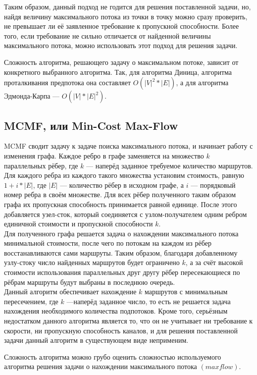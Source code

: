 \documentclass[a4paper]{article}
\begin{document}
Таким образом, данный подход не годится для решения поставленной задачи, но, найдя величину максимального потока из точки в точку можно сразу проверить, не превышает ли её заявленное требование к пропускной способности. Более того, если требование не сильно отличается от найденной величины максимального потока, можно использовать этот подход для решения задачи.

Сложность алгоритма, решающего задачу о максимальном потоке, зависит от конкретного выбранного алгоритма. Так, для алгоритма Диница, алгоритма проталкивания предпотока она составляет $O(|V|^2*|E|)$, а для алгоритма Эдмонда-Карпа --- $O(|V|*|E|^2)$.

\subsection{MCMF, или Min-Cost Max-Flow\cite{stepsmel}}
MCMF сводит задачу к задаче поиска максимального потока, и начинает работу с изменения графа. 
Каждое ребро в графе заменяется на множество $k$ параллельных рёбер, где $k$ --- наперёд заданное требуемое количество маршрутов. Для каждого ребра из каждого такого множества установим стоимость, равную $1+i*|E|$, где $|E|$ --- количество рёбер в исходном графе, а $i$ --- порядковый номер ребра в своём множестве.
Для всех рёбер полученного таким образом графа их пропускная способность принимается равной единице. После этого добавляется узел-сток, который соединяется с узлом-получателем одним ребром единичной стоимости и пропускной способности $k$.\\
Для полученного графа решается задача о нахождении максимального потока минимальной стоимости, после чего по потокам на каждом из рёбер восстанавливаются сами маршруты.
Таким образом, благодаря добавленному узлу-стоку число найденных маршрутов будет ограничено $k$, а за счёт высокой стоимости использования параллельных друг другу рёбер пересекающиеся по рёбрам маршруты будут выбраны в последнюю очередь.\\
Данный алгоритм обеспечивает нахождение $k$ маршрутов с минимальным пересечением, где $k$ ---наперёд заданное число, то есть не решается задача нахождения необходимого количества подпотоков. Кроме того, серьёзным недостатком данного алгоритма является то, что он не учитывает ни требование к скорости, ни пропускную способность каналов, и для решения поставленной задачи данный алгоритм в существующем виде неприменим.

Сложность алгоритма можно грубо оценить сложностью используемого алгоритма решения задачи о нахождении максимального потока $(maxflow)$.
\end{document}
